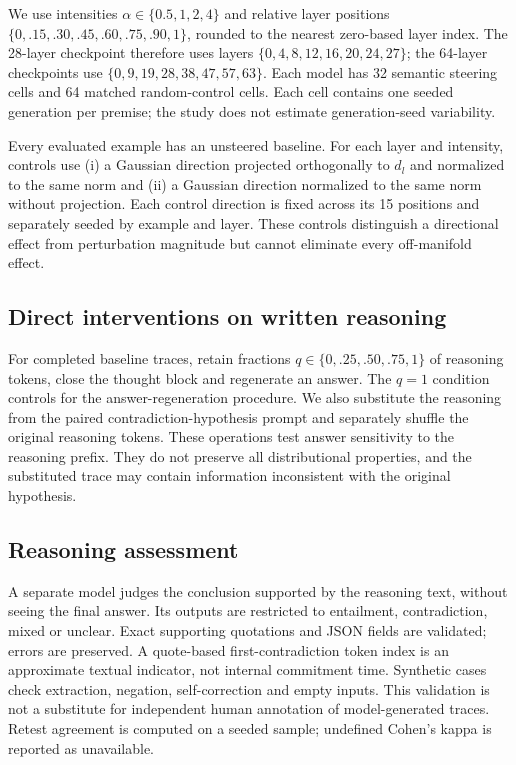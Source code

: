 \documentclass[11pt]{article}
\begin{document}
We use intensities $\alpha\in\{0.5,1,2,4\}$ and relative layer positions
$\{0,.15,.30,.45,.60,.75,.90,1\}$, rounded to the nearest zero-based layer index.
The 28-layer checkpoint therefore uses layers $\{0,4,8,12,16,20,24,27\}$; the
64-layer checkpoints use $\{0,9,19,28,38,47,57,63\}$. Each model has 32 semantic
steering cells and 64 matched random-control cells. Each cell contains one seeded
generation per premise; the study does not estimate generation-seed variability.

Every evaluated example has an unsteered baseline. For each layer and intensity,
controls use (i) a Gaussian direction projected orthogonally to $d_l$ and normalized
to the same norm and (ii) a Gaussian direction normalized to the same norm without
projection. Each control direction is fixed across its 15 positions and separately
seeded by example and layer. These controls distinguish a directional effect from
perturbation magnitude but cannot eliminate every off-manifold effect.

\subsection{Direct interventions on written reasoning}
For completed baseline traces, retain fractions $q\in\{0,.25,.50,.75,1\}$ of
reasoning tokens, close the thought block and regenerate an answer. The $q=1$
condition controls for the answer-regeneration procedure. We also substitute the
reasoning from the paired contradiction-hypothesis prompt and separately shuffle the
original reasoning tokens. These operations test answer sensitivity to the reasoning
prefix. They do not preserve all distributional properties, and the substituted
trace may contain information inconsistent with the original hypothesis.

\subsection{Reasoning assessment}
A separate model judges the conclusion supported by the reasoning text, without
seeing the final answer. Its outputs are restricted to entailment, contradiction,
mixed or unclear. Exact supporting quotations and JSON fields are validated; errors
are preserved. A quote-based first-contradiction token index is an approximate textual
indicator, not internal commitment time. Synthetic cases check extraction, negation,
self-correction and empty inputs. This validation is not a substitute for independent
human annotation of model-generated traces. Retest agreement is computed on a seeded
sample; undefined Cohen's kappa is reported as unavailable.
\end{document}
